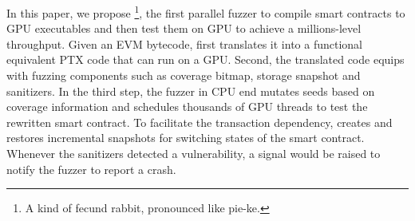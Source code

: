 In this paper, we propose {\tool}\footnote{A kind of fecund rabbit, pronounced like pie-ke.}, the first parallel fuzzer to compile smart contracts to GPU executables and then test them on GPU to achieve a millions-level throughput.   
Given an EVM bytecode, {\tool} first translates it into a functional equivalent PTX code that can run on a GPU. 
Second, the translated code equips with fuzzing components such as coverage bitmap, storage snapshot and sanitizers. 
In the third step, the fuzzer in CPU end mutates seeds based on coverage information and schedules thousands of GPU threads to test the rewritten smart contract.
To facilitate the transaction dependency, {\tool} creates and restores incremental snapshots for switching states of the smart contract. 
Whenever the sanitizers detected a vulnerability, a signal would be raised to notify the fuzzer to report a crash.

